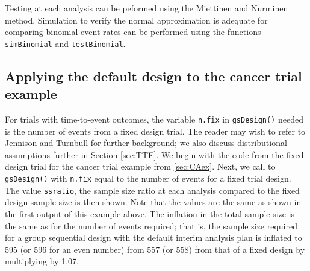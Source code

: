 Testing at each analysis can be peformed using the Miettinen and Nurminen \cite{MandN} method.
Simulation to verify the normal approximation is adequate for comparing binomial event rates can be performed using the functions \texttt{simBinomial} and \texttt{testBinomial}.

\subsection{Applying the default design to the cancer trial example}
For trials with time-to-event outcomes, the variable \texttt{n.fix} in \texttt{gsDesign()} needed is the number of events from a fixed design trial. 
The reader may wish to refer to Jennison and Turnbull \cite{JTBook} for further background; we also discuss distributional assumptions further in Section \ref{sec:TTE}.
We begin with the code from the fixed design trial for the cancer trial example from \ref{sec:CAex}.
Next, we call to \texttt{gsDesign()} with \texttt{n.fix} equal to the number of events for a fixed trial design. 
The value \texttt{ssratio}, the sample size ratio at each analysis compared to the fixed design sample size is then shown. Note that the values are the same as shown in the first output of this example above.
The inflation in the total sample size is the same as for the number of events required; that is, the sample size required for a group sequential design with the default interim analysis plan is inflated to 595 (or 596 for an even number) from 557 (or 558) from that of a fixed design by multiplying by 1.07. 

